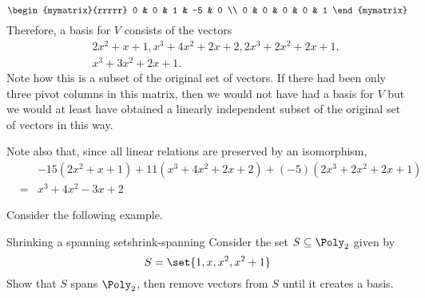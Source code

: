 \begin{solution}
\begin{equation*}
\begin{mymatrix}{rrrrr}
0 & 0 & 1 & -5 & 0 \\ 
0 & 0 & 0 & 0 & 1
\end{mymatrix}
\end{equation*}
Therefore, a basis for $V$ consists of the vectors
\begin{eqnarray*}
&&2x^{2}+x+1,x^{3}+4x^{2}+2x+2,2x^{3}+2x^{2}+2x+1, \\
&&x^{3}+3x^{2}+2x+1.
\end{eqnarray*}
Note how this is a subset of the original set of vectors. If there had been
only three pivot columns in this matrix, then we would not have had a basis
for $V$ but we would at least have obtained a linearly independent subset of
the original set of vectors in this way. 

Note also that, since all linear relations are preserved by an isomorphism,
\begin{eqnarray*}
&&-15(2x^{2}+x+1) +11(x^{3}+4x^{2}+2x+2) +(
-5) (2x^{3}+2x^{2}+2x+1) \\
&=&x^{3}+4x^{2}-3x+2
\end{eqnarray*}

\end{solution}

Consider the following example.

\begin{example}{Shrinking a spanning set}{shrink-spanning}
Consider the set $S \subseteq \Poly_2$ given by 
\[
S = \set{1, x, x^2, x^2 + 1 }
\]
Show that $S$ spans $\Poly_2$, then remove vectors from $S$ until it creates a basis. 
\end{example}

